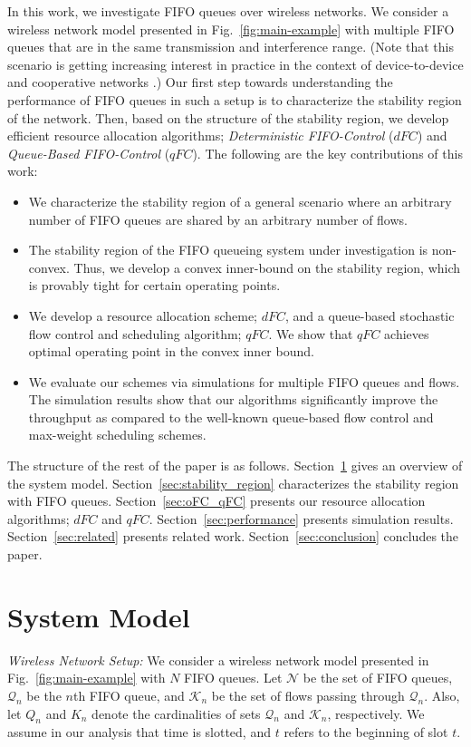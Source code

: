 \documentclass[conference]{IEEEtran}
\newcommand{\Kset}{\mathcal{K}}
\newcommand{\Nset}{\mathcal{N}}
\newcommand{\Qset}{\mathcal{Q}}
\begin{document}
In this work, we investigate FIFO queues over wireless networks. We consider a wireless network model presented in Fig.~\ref{fig:main-example} with multiple FIFO queues that are in the same transmission and interference range. (Note that this scenario is getting increasing interest in practice in the context of device-to-device and cooperative networks \cite{microcast}.) 
Our first step towards understanding the performance of FIFO queues in such a setup is to characterize the stability region of the network. Then, based on the structure of the stability region, we develop efficient resource allocation algorithms; {\em Deterministic FIFO-Control} ($dFC$) and {\em Queue-Based FIFO-Control} ($qFC$). The following are the key contributions of this work:
\begin{itemize}
\item We characterize the stability region of a general scenario where an arbitrary number of FIFO queues are shared by an arbitrary number of flows.
\item The stability region of the FIFO queueing system under investigation is non-convex. Thus, we develop a convex inner-bound on the stability region, which is provably tight for certain operating points.
\item We develop a resource allocation scheme; $dFC$, and a queue-based stochastic flow control and scheduling algorithm; $qFC$. We show that $qFC$ achieves optimal operating point in the convex inner bound.
\item We evaluate our schemes via simulations for multiple FIFO queues and flows. The simulation results show that our algorithms significantly improve the throughput as compared to the well-known queue-based flow control and max-weight scheduling schemes.
\end{itemize}

The structure of the rest of the paper is as follows. Section~\ref{sec:system} gives an overview of the system model. Section~\ref{sec:stability_region} characterizes the stability region with FIFO queues. Section~\ref{sec:oFC_qFC} presents our resource allocation algorithms; $dFC$ and $qFC$. Section~\ref{sec:performance} presents simulation results. Section~\ref{sec:related} presents related work. Section~\ref{sec:conclusion} concludes the paper.


\section{System Model}\label{sec:system}
{\em Wireless Network Setup:}
We consider a wireless network model presented in Fig.~\ref{fig:main-example} with $N$ FIFO queues. Let $\Nset$ be the set of FIFO queues, $\Qset_n$ be the $n$th FIFO queue, and $\Kset_n$ be the set of flows passing through $\Qset_n$. Also, let $Q_{n}$ and $K_n$ denote the cardinalities of sets $\Qset_n$ and $\Kset_n$, respectively. We assume in our analysis that time is slotted, and $t$ refers to the beginning of slot $t$.
\end{document}
